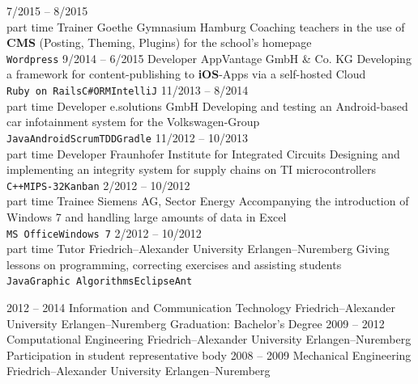 \documentclass[9pt]{developercv} %
\begin{document}
\begin{entrylist}
{    }
  \entry
		{7/2015 -- 8/2015\\\footnotesize{part time}}
		{Trainer}
		{Goethe Gymnasium Hamburg}
		{
      Coaching teachers in the use of \textbf{CMS} (Posting, Theming, Plugins) for the school's homepage\\
      \texttt{Wordpress}
    }
  \entry
		{9/2014 -- 6/2015}
		{Developer}
		{AppVantage GmbH \& Co. KG}
		{
      Developing a framework for content-publishing to \textbf{iOS}-Apps via a self-hosted Cloud\\
      \texttt{Ruby on Rails}\slashsep\texttt{C\#}\slashsep\texttt{ORM}\slashsep\texttt{IntelliJ}
    }
  \entry
		{11/2013 -- 8/2014\\\footnotesize{part time}}
		{Developer}
		{e.solutions GmbH}
		{
      Developing and testing an Android-based car infotainment system for the Volkswagen-Group\\
      \texttt{Java}\slashsep\texttt{Android}\slashsep\texttt{Scrum}\slashsep\texttt{TDD}\slashsep\texttt{Gradle}
    }
  \entry
		{11/2012 -- 10/2013\\\footnotesize{part time}}
		{Developer}
		{Fraunhofer Institute for Integrated Circuits}
		{
      Designing and implementing an integrity system for supply chains on TI microcontrollers\\
      \texttt{C++}\slashsep\texttt{MIPS-32}\slashsep\texttt{Kanban}
    }
  \entry
		{2/2012 -- 10/2012\\\footnotesize{part time}}
		{Trainee}
		{Siemens AG, Sector Energy}
		{
      Accompanying the introduction of Windows 7 and handling large amounts of data in Excel\\
      \texttt{MS Office}\slashsep\texttt{Windows 7}
    }
  \entry
		{2/2012 -- 10/2012\\\footnotesize{part time}}
		{Tutor}
		{Friedrich–Alexander University Erlangen–Nuremberg}
		{
      Giving lessons on programming, correcting exercises and assisting students\\
      \texttt{Java}\slashsep\texttt{Graphic Algorithms}\slashsep\texttt{Eclipse}\slashsep\texttt{Ant}
    }
\end{entrylist}



\begin{entrylist}
	\entry
		{2012 -- 2014}
		{Information and Communication Technology}
		{Friedrich–Alexander University Erlangen–Nuremberg}
		{Graduation: Bachelor's Degree}
	\entry
		{2009 -- 2012}
		{Computational Engineering}
		{Friedrich–Alexander University Erlangen–Nuremberg}
		{Participation in student representative body}
	\entry
		{2008 -- 2009}
		{Mechanical Engineering}
		{Friedrich–Alexander University Erlangen–Nuremberg}
		{}
\end{entrylist}
\end{document}
